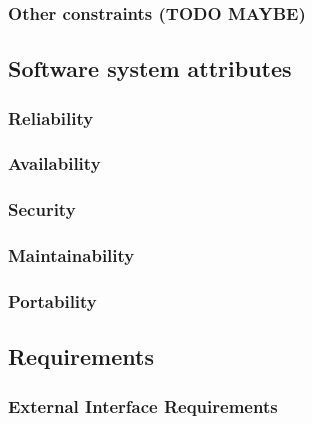 \subsubsection{Other constraints (TODO MAYBE)}

\subsection{Software system attributes}
\subsubsection{Reliability}
\subsubsection{Availability}
\subsubsection{Security}
\subsubsection{Maintainability}
\subsubsection{Portability}
\subsection{Requirements}
\subsubsection{External Interface Requirements}
\clearpage